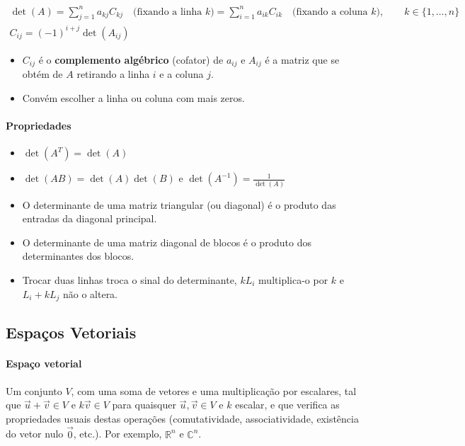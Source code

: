 \documentclass{article}
\begin{document}
\begin{gather*}
\det(A)
= \sum_{j=1}^{n} a_{kj} C_{kj} \quad \text{(fixando a linha } k \text{)}
= \sum_{i=1}^{n} a_{ik} C_{ik} \quad \text{(fixando a coluna } k \text{)},
\qquad k \in \{1, \ldots, n\}
\\
C_{ij} = (-1)^{i+j} \det(A_{ij})
\end{gather*}

\begin{itemize}
    \item $C_{ij}$ é o \textbf{complemento algébrico} (cofator) de $a_{ij}$ e $A_{ij}$ é a matriz que se obtém
    de $A$ retirando a linha $i$ e a coluna $j$.
    \item Convém escolher a linha ou coluna com mais zeros.
\end{itemize}

\paragraph{Propriedades}

\begin{itemize}
    \item $\det(A^T) = \det(A)$
    \item $\det(AB) = \det(A)\det(B)$ e $\det(A^{-1}) = \frac{1}{\det(A)}$
    \item O determinante de uma matriz triangular (ou diagonal) é o produto das entradas da diagonal principal.
    \item O determinante de uma matriz diagonal de blocos é o produto dos determinantes dos blocos.
    \item Trocar duas linhas troca o sinal do determinante, $k L_i$ multiplica-o por $k$ e $L_i + k L_j$ não
    o altera.
\end{itemize}

\bigskip

\subsection{Espaços Vetoriais}

\paragraph{Espaço vetorial}

Um conjunto $V$, com uma soma de vetores e uma multiplicação por escalares, tal que
$\vec{u} + \vec{v} \in V$ e $k\vec{v} \in V$ para quaisquer $\vec{u}, \vec{v} \in V$ e $k$ escalar,
e que verifica as propriedades usuais destas operações (comutatividade, associatividade, existência do vetor
nulo $\vec{0}$, etc.). Por exemplo, $\mathbb{R}^n$ e $\mathbb{C}^n$.
\end{document}
